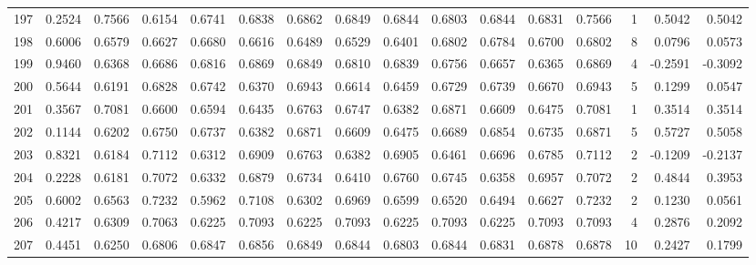 \begin{tabular}{lrrrrrrrrrrrrrrr}
197 &      0.2524 &  0.7566 &  0.6154 &  0.6741 &  0.6838 &  0.6862 &  0.6849 &  0.6844 &  0.6803 &  0.6844 &   0.6831 &     0.7566 &      1 &                    0.5042 &                     0.5042 \\
198 &      0.6006 &  0.6579 &  0.6627 &  0.6680 &  0.6616 &  0.6489 &  0.6529 &  0.6401 &  0.6802 &  0.6784 &   0.6700 &     0.6802 &      8 &                    0.0796 &                     0.0573 \\
199 &      0.9460 &  0.6368 &  0.6686 &  0.6816 &  0.6869 &  0.6849 &  0.6810 &  0.6839 &  0.6756 &  0.6657 &   0.6365 &     0.6869 &      4 &                   -0.2591 &                    -0.3092 \\
200 &      0.5644 &  0.6191 &  0.6828 &  0.6742 &  0.6370 &  0.6943 &  0.6614 &  0.6459 &  0.6729 &  0.6739 &   0.6670 &     0.6943 &      5 &                    0.1299 &                     0.0547 \\
201 &      0.3567 &  0.7081 &  0.6600 &  0.6594 &  0.6435 &  0.6763 &  0.6747 &  0.6382 &  0.6871 &  0.6609 &   0.6475 &     0.7081 &      1 &                    0.3514 &                     0.3514 \\
202 &      0.1144 &  0.6202 &  0.6750 &  0.6737 &  0.6382 &  0.6871 &  0.6609 &  0.6475 &  0.6689 &  0.6854 &   0.6735 &     0.6871 &      5 &                    0.5727 &                     0.5058 \\
203 &      0.8321 &  0.6184 &  0.7112 &  0.6312 &  0.6909 &  0.6763 &  0.6382 &  0.6905 &  0.6461 &  0.6696 &   0.6785 &     0.7112 &      2 &                   -0.1209 &                    -0.2137 \\
204 &      0.2228 &  0.6181 &  0.7072 &  0.6332 &  0.6879 &  0.6734 &  0.6410 &  0.6760 &  0.6745 &  0.6358 &   0.6957 &     0.7072 &      2 &                    0.4844 &                     0.3953 \\
205 &      0.6002 &  0.6563 &  0.7232 &  0.5962 &  0.7108 &  0.6302 &  0.6969 &  0.6599 &  0.6520 &  0.6494 &   0.6627 &     0.7232 &      2 &                    0.1230 &                     0.0561 \\
206 &      0.4217 &  0.6309 &  0.7063 &  0.6225 &  0.7093 &  0.6225 &  0.7093 &  0.6225 &  0.7093 &  0.6225 &   0.7093 &     0.7093 &      4 &                    0.2876 &                     0.2092 \\
207 &      0.4451 &  0.6250 &  0.6806 &  0.6847 &  0.6856 &  0.6849 &  0.6844 &  0.6803 &  0.6844 &  0.6831 &   0.6878 &     0.6878 &     10 &                    0.2427 &                     0.1799 \\

\end{tabular}

